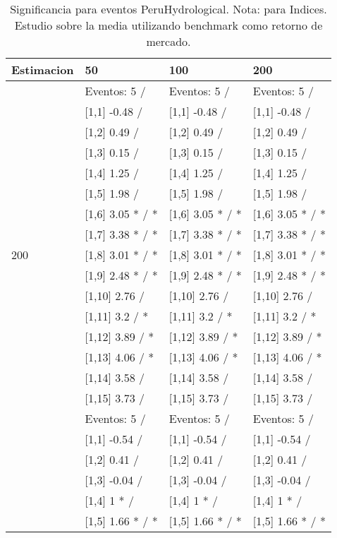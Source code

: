 \begin{table}

\caption{Significancia para eventos PeruHydrological. Nota: para Indices. Estudio sobre la media utilizando benchmark como retorno de mercado.}
\centering
\begin{tabular}[t]{llll}
\toprule
Estimacion & 50 & 100 & 200\\
\midrule
 & Eventos:  5 / & Eventos:  5 / & Eventos:  5 /\\
 & {}[1,1] -0.48  / & {}[1,1] -0.48  / & {}[1,1] -0.48  /\\
 & {}[1,2] 0.49  / & {}[1,2] 0.49  / & {}[1,2] 0.49  /\\
 & {}[1,3] 0.15  / & {}[1,3] 0.15  / & {}[1,3] 0.15  /\\
 & {}[1,4] 1.25  / & {}[1,4] 1.25  / & {}[1,4] 1.25  /\\
\addlinespace
 & {}[1,5] 1.98  / & {}[1,5] 1.98  / & {}[1,5] 1.98  /\\
 & {}[1,6] 3.05 * / * & {}[1,6] 3.05 * / * & {}[1,6] 3.05 * / *\\
 & {}[1,7] 3.38 * / * & {}[1,7] 3.38 * / * & {}[1,7] 3.38 * / *\\
200 & {}[1,8] 3.01 * / * & {}[1,8] 3.01 * / * & {}[1,8] 3.01 * / *\\
 & {}[1,9] 2.48 * / * & {}[1,9] 2.48 * / * & {}[1,9] 2.48 * / *\\
\addlinespace
 & {}[1,10] 2.76  / & {}[1,10] 2.76  / & {}[1,10] 2.76  /\\
 & {}[1,11] 3.2  / * & {}[1,11] 3.2  / * & {}[1,11] 3.2  / *\\
 & {}[1,12] 3.89  / * & {}[1,12] 3.89  / * & {}[1,12] 3.89  / *\\
 & {}[1,13] 4.06  / * & {}[1,13] 4.06  / * & {}[1,13] 4.06  / *\\
 & {}[1,14] 3.58  / & {}[1,14] 3.58  / & {}[1,14] 3.58  /\\
\addlinespace
 & {}[1,15] 3.73  / & {}[1,15] 3.73  / & {}[1,15] 3.73  /\\
 & Eventos:  5 / & Eventos:  5 / & Eventos:  5 /\\
 & {}[1,1] -0.54  / & {}[1,1] -0.54  / & {}[1,1] -0.54  /\\
 & {}[1,2] 0.41  / & {}[1,2] 0.41  / & {}[1,2] 0.41  /\\
 & {}[1,3] -0.04  / & {}[1,3] -0.04  / & {}[1,3] -0.04  /\\
\addlinespace
 & {}[1,4] 1 * / & {}[1,4] 1 * / & {}[1,4] 1 * /\\
 & {}[1,5] 1.66 * / * & {}[1,5] 1.66 * / * & {}[1,5] 1.66 * / *\\

\end{tabular}
\end{table}
